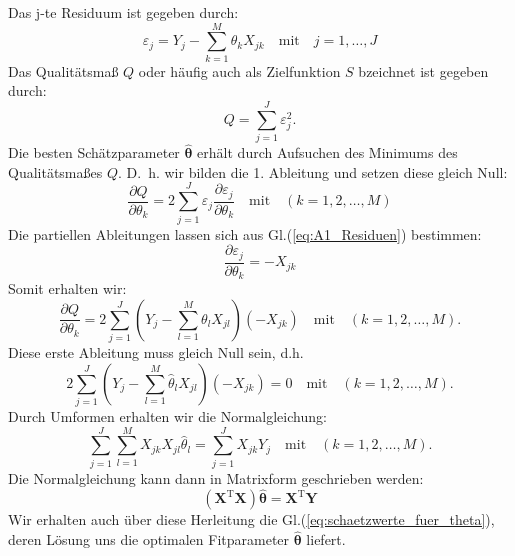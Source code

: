 Das j-te Residuum ist gegeben durch: 
\begin{equation}
\varepsilon_j= Y_j - \sum_{k=1}^{M}\theta_k X_{jk} \quad \mathrm{mit} 
\quad j=1,\ldots,J 
\label{eq:A1_Residuen}
\end{equation}
Das Qualitätsmaß $Q$ oder häufig auch als Zielfunktion $S$ bzeichnet 
ist gegeben durch: 
\begin{equation} 
Q = \sum_{j=1}^J \varepsilon_j^2. 
\end{equation}
Die besten Schätzparameter $\hat{\boldsymbol{\theta}}$ 
erhält durch Aufsuchen des Minimums des Qualitätsmaßes $Q$.
D.~h. wir bilden die 1. Ableitung und setzen diese gleich Null: 
\begin{equation}
\frac{\partial Q}{\partial \theta_k} =2\sum_{j = 1}^J \varepsilon_j\frac{\partial \varepsilon_j}{\partial \theta_k} \quad \mathrm{mit} \quad (k=1,2,\ldots, M)
\end{equation}
Die partiellen Ableitungen lassen sich aus Gl.(\ref{eq:A1_Residuen}) bestimmen: 
\begin{equation}
\frac{\partial \varepsilon_j}{\partial \theta_k}=-X_{jk}
\end{equation}
Somit erhalten wir:
\begin{equation}
\frac{\partial Q}{\partial \theta_k} = 2\sum_{j=1}^{J} \left( Y_j-\sum_{l=1}^{M} \theta_l X_{jl} \right) (-X_{jk}) 
\quad \mathrm{mit} \quad (k=1,2,\dots, M).
\end{equation}
Diese erste Ableitung muss gleich Null sein, d.h.
\begin{equation}
2\sum_{j=1}^{J} \left( Y_j-\sum_{l=1}^{M} \hat\theta_l X_{jl} \right) (-X_{jk}) 
= 0 \quad \mathrm{mit} \quad (k=1,2,\dots, M).
\end{equation}
Durch Umformen erhalten wir die \glqq Normalgleichung\grqq:
\begin{equation}
\sum_{j=1}^{J} \sum_{l=1}^{M} X_{jk} X_{jl} \hat\theta_l 
= \sum_{j=1}^{J} X_{jk} Y_j \quad \mathrm{mit} \quad (k=1,2,\dots, M).
\end{equation}
Die Normalgleichung kann dann in Matrixform geschrieben werden: 
\begin{equation}
(\mathbf X^\mathrm{T} \mathbf X) \hat{\boldsymbol{\theta}} = \mathbf X^\mathrm{T} \mathbf Y
\end{equation}
Wir erhalten auch über diese Herleitung die Gl.(\ref{eq:schaetzwerte_fuer_theta}),
deren Lösung uns die optimalen Fitparameter $\hat{\boldsymbol{\theta}}$ liefert.

